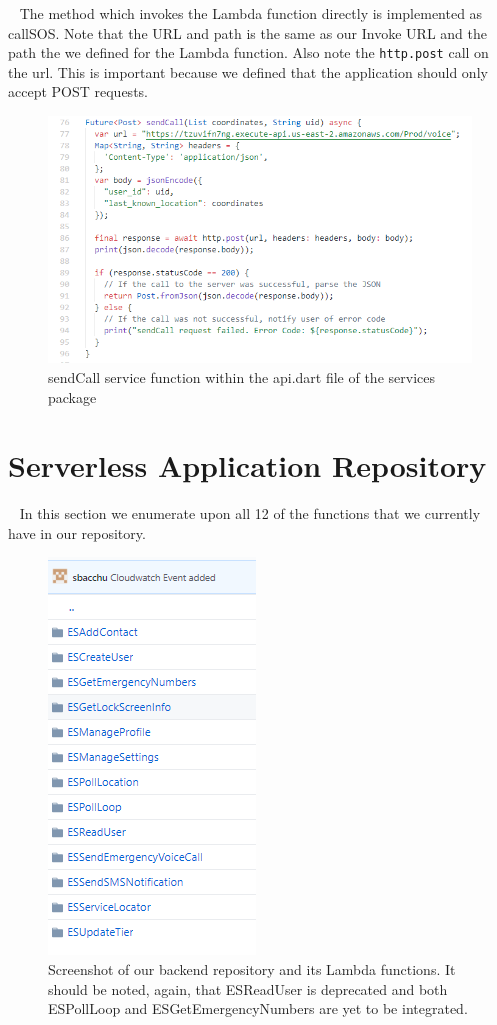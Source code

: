 \documentclass[10pt, a4paper]{article}
\begin{document}
\par ~ The method which invokes the Lambda function directly is implemented as callSOS. Note that the URL and path is the same as our Invoke URL and the path the we defined for the Lambda function. Also note the \texttt{http.post} call on the url. This is important because we defined that the application should only accept POST requests.
\begin{figure}[H]
\begin{center}
  \includegraphics[scale=1]{code-screenshots/send-call.PNG}
  \caption{sendCall service function within the api.dart file of the services package}
\end{center}
\end{figure}


\section{Serverless Application Repository}
\par ~ In this section we enumerate upon all 12 of the functions that we currently have in our repository.
\begin{figure}[H]
\begin{center}
  \includegraphics[scale=1]{code-screenshots/sap.PNG}
  \caption{Screenshot of our backend repository and its Lambda functions. It should be noted, again, that ESReadUser is deprecated and both ESPollLoop and ESGetEmergencyNumbers are yet to be integrated.}
\end{center}
\end{figure}
\end{document}

